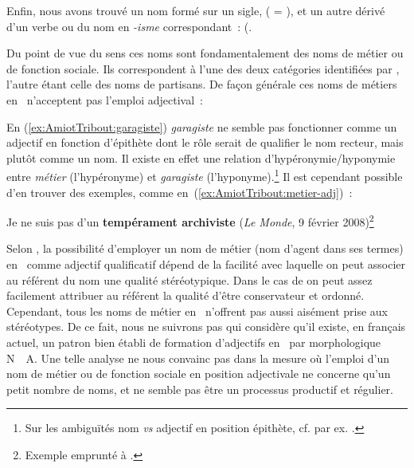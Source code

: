 \documentclass[output=paper]{LSP/langsci}
\begin{document}
Enfin, nous avons trouvé un nom formé sur un sigle,  (\orientg {} = ), et un autre dérivé d'un verbe ou du nom en \textit{-isme} correspondant~:  (\orientg {}. 


Du point de vue du sens ces noms sont fondamentalement des noms de métier ou de fonction sociale. Ils correspondent à l'une des deux catégories identifiées par \citep{wolf72}, l'autre étant celle des noms de partisans. De façon générale  ces noms de métiers en \iste\  n'acceptent pas l'emploi adjectival~:

\begin{exe}
 \label{ex:AmiotTribout:garagiste}
\end{exe}

En (\ref{ex:AmiotTribout:garagiste}) \textit{garagiste} ne semble pas fonctionner comme un adjectif en fonction d'épithète dont le rôle serait de qualifier le nom recteur, mais plutôt comme un nom. Il existe en effet une relation d'hypéronymie/hyponymie entre \textit{métier} (l'hypéronyme) et \textit{garagiste} (l'hyponyme).\footnote{Sur les ambiguïtés nom \textit{vs} adjectif en position épithète, cf. par ex. \cite{noailly99}.} Il est cependant possible d'en trouver des exemples, comme en~(\ref{ex:AmiotTribout:metier-adj})~:

\begin{exe}
\ex \label{ex:AmiotTribout:metier-adj}
Je ne suis pas d'un \textbf{tempérament  archiviste} (\textit{Le Monde}, 9 février 2008)\footnote{Exemple emprunté à \citep{rainer16}.}
\end{exe}

Selon \cite{rainer16}, la possibilité d'employer un nom de métier (nom d'agent dans ses termes) en \iste\  comme adjectif qualificatif  dépend de la facilité avec laquelle on peut associer au référent du nom une qualité stéréotypique. Dans le cas de  on peut assez facilement attribuer  au référent la qualité d'être conservateur et ordonné. Cependant, tous les noms de métier en \iste\ n'offrent pas aussi aisément prise aux stéréotypes.
De ce fait, nous ne suivrons pas \cite{rainer16} qui considère qu'il existe, en français actuel, un patron bien établi de formation d'adjectifs en \iste\ par   morphologique N~\orientd~A. Une telle analyse ne nous convainc pas dans la mesure où l'emploi d'un nom de métier ou de fonction sociale en position adjectivale ne concerne qu'un petit nombre de noms, et ne semble pas être un processus productif et régulier. 
\end{document}

